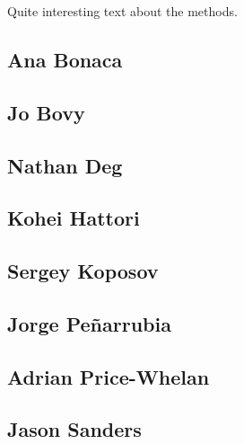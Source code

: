 Quite interesting text about the methods.

\subsection{Ana Bonaca}


\subsection{Jo Bovy}


\subsection{Nathan Deg}


\subsection{Kohei Hattori}


\subsection{Sergey Koposov}


\subsection{Jorge Pe\~narrubia}


\subsection{Adrian Price-Whelan}


\subsection{Jason Sanders}
